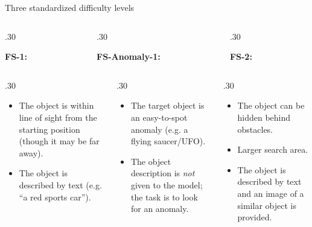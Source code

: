 \documentclass[final]{beamer}
\newlength{\colwidth}
\begin{document}
\begin{frame}[t]
\begin{columns}[t]
\begin{column}{\colwidth}
\begin{block}{Three standardized difficulty levels}
\begin{columns}[t,totalwidth=\colwidth]
\begin{column}{.30\colwidth}
\begin{center}
\textbf{FS-1:}
\end{center}
\end{column}

\begin{column}{.30\colwidth}
\begin{center}
    
    \vspace{0.5cm}

\textbf{FS-Anomaly-1:}
\end{center}
\end{column}

\begin{column}{.30\colwidth}
\begin{center}
    
\vspace{0.5cm}

\textbf{FS-2:}
\end{center}
\end{column}
\end{columns}
\begin{columns}[t,totalwidth=\colwidth]

\begin{column}{.30\colwidth}
\begin{itemize}
\item The object is within line of sight from the starting position (though it may be far away).
\item The object is described by text (e.g. ``a red sports car'').
\end{itemize}
\end{column}

\begin{column}{.30\colwidth}
\begin{itemize}
\item The target object is an easy-to-spot anomaly (e.g. a flying saucer/UFO).
\item The object description is \textit{not} given to the model; the task is to look for an anomaly.
\end{itemize}
\end{column}

\begin{column}{.30\colwidth}
\begin{itemize}
\item The object can be hidden behind obstacles.
\item Larger search area.
\item The object is described by text and an image of a similar object is provided.
\end{itemize}
\end{column}
\end{columns}


\end{block}
\end{column}
\end{columns}
\end{frame}
\end{document}
